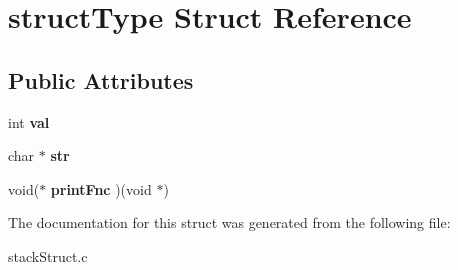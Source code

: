 \hypertarget{structstructType}{}\section{struct\+Type Struct Reference}
\label{structstructType}
\subsection*{Public Attributes}
\begin{DoxyCompactItemize}
\item 
\mbox{\label{structstructType_a33ce84a888d717cd987802b405c4976e}} 
int {\bfseries val}
\item 
\mbox{\label{structstructType_a4cab1cedb62dea9a4e58d4c25d88126b}} 
char $\ast$ {\bfseries str}
\item 
\mbox{\label{structstructType_ab2a980f90c1432c4e05e123738e16d18}} 
void($\ast$ {\bfseries print\+Fnc} )(void $\ast$)
\end{DoxyCompactItemize}


The documentation for this struct was generated from the following file\+:\begin{DoxyCompactItemize}
\item 
stack\+Struct.\+c\end{DoxyCompactItemize}
